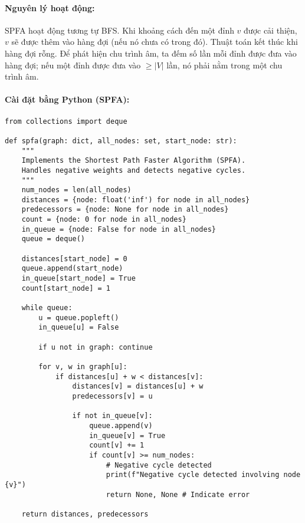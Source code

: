 \documentclass[a4paper,12pt]{article}
\begin{document}
\paragraph{Nguyên lý hoạt động:} SPFA hoạt động tương tự BFS. Khi khoảng cách đến một đỉnh $v$ được cải thiện, $v$ sẽ được thêm vào hàng đợi (nếu nó chưa có trong đó). Thuật toán kết thúc khi hàng đợi rỗng. Để phát hiện chu trình âm, ta đếm số lần mỗi đỉnh được đưa vào hàng đợi; nếu một đỉnh được đưa vào $\ge |V|$ lần, nó phải nằm trong một chu trình âm.

\paragraph{Cài đặt bằng Python (SPFA):}
\begin{lstlisting}[style=pythonstyle, caption={Cài đặt SPFA trong Python.}, label={lst:python_spfa}]
from collections import deque

def spfa(graph: dict, all_nodes: set, start_node: str):
    """
    Implements the Shortest Path Faster Algorithm (SPFA).
    Handles negative weights and detects negative cycles.
    """
    num_nodes = len(all_nodes)
    distances = {node: float('inf') for node in all_nodes}
    predecessors = {node: None for node in all_nodes}
    count = {node: 0 for node in all_nodes}
    in_queue = {node: False for node in all_nodes}
    queue = deque()

    distances[start_node] = 0
    queue.append(start_node)
    in_queue[start_node] = True
    count[start_node] = 1

    while queue:
        u = queue.popleft()
        in_queue[u] = False

        if u not in graph: continue

        for v, w in graph[u]:
            if distances[u] + w < distances[v]:
                distances[v] = distances[u] + w
                predecessors[v] = u
                
                if not in_queue[v]:
                    queue.append(v)
                    in_queue[v] = True
                    count[v] += 1
                    if count[v] >= num_nodes:
                        # Negative cycle detected
                        print(f"Negative cycle detected involving node {v}")
                        return None, None # Indicate error
    
    return distances, predecessors
\end{lstlisting}
\end{document}
